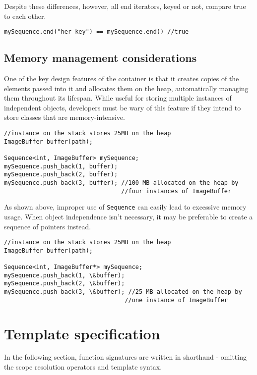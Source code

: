 ﻿\documentclass{article}
\begin{document}
Despite these differences, however, all end iterators, keyed or not, compare
true to each other.

\begin{verbatim}
mySequence.end("her key") == mySequence.end() //true
\end{verbatim}

\subsection{Memory management considerations}

One of the key design features of the container is that it creates copies
of the elements passed into it and allocates them on the heap, automatically
managing them throughout its lifespan. While useful for storing multiple
instances of independent objects, developers must be wary of this feature if
they intend to store classes that are memory-intensive.

\begin{verbatim}
//instance on the stack stores 25MB on the heap
ImageBuffer buffer(path);

Sequence<int, ImageBuffer> mySequence;
mySequence.push_back(1, buffer);
mySequence.push_back(2, buffer);
mySequence.push_back(3, buffer); //100 MB allocated on the heap by
                                 //four instances of ImageBuffer
\end{verbatim}

As shown above, improper use of {\tt Sequence} can easily lead to excessive
memory usage. When object independence isn't necessary, it may be preferable
to create a sequence of pointers instead.

\begin{verbatim}
//instance on the stack stores 25MB on the heap
ImageBuffer buffer(path);

Sequence<int, ImageBuffer*> mySequence;
mySequence.push_back(1, \&buffer);
mySequence.push_back(2, \&buffer);
mySequence.push_back(3, \&buffer); //25 MB allocated on the heap by
                                  //one instance of ImageBuffer
\end{verbatim}

\section{Template specification}

In the following section, function signatures are written in shorthand -
omitting the scope resolution operators and template syntax.
\end{document}
